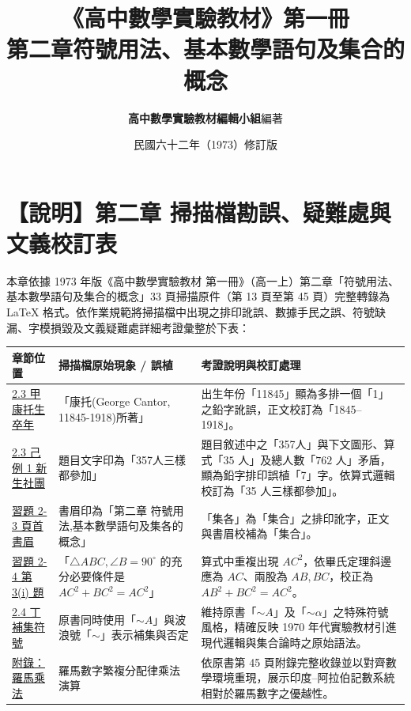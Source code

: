 \documentclass[a4paper,12pt,twoside]{article}
\title{\LARGE\textbf{《高中數學實驗教材》第一冊}\\[0.5em] \Large\textbf{第二章\quad 符號用法、基本數學語句及集合的概念}}
\author{\textbf{高中數學實驗教材編輯小組}\quad 編著}
\date{民國六十二年（1973）修訂版}
\begin{document}
\maketitle
\thispagestyle{firstpage}

\section*{【說明】第二章 掃描檔勘誤、疑難處與文義校訂表}
\label{sec:ch2_errata_notes}\label{sec:master_errata_notes}

本章依據 1973 年版《高中數學實驗教材 第一冊》（高一上）第二章「符號用法、基本數學語句及集合的概念」33 頁掃描原件（第 13 頁至第 45 頁）完整轉錄為 \LaTeX{} 格式。依作業規範將掃描檔中出現之排印訛誤、數據手民之誤、符號缺漏、字模損毀及文義疑難處詳細考證彙整於下表：

\begin{table}[H]
\centering
\small
\renewcommand{\arraystretch}{1.35}
\begin{tabularx}{\textwidth}{|p{3.2cm}|p{3.8cm}|X|}
\hline
\textbf{章節位置} & \textbf{掃描檔原始現象 / 誤植} & \textbf{考證說明與校訂處理} \\ \hline

\hyperref[subsec:2-3-a]{2.3 甲 康托生卒年} & 
「康托(George Cantor, 11845-1918)所著」 & 
出生年份「11845」顯為多排一個「1」之鉛字訛誤，正文校訂為「1845--1918」。 \\ \hline

\hyperref[subsec:2-3-f]{2.3 己 例 1 新生社團} & 
題目文字印為「357人三樣都參加」 & 
題目敘述中之「357人」與下文圖形、算式「$35$ 人」及總人數「$762$ 人」矛盾，顯為鉛字排印誤植「7」字。依算式邏輯校訂為「35 人三樣都參加」。 \\ \hline

\hyperref[sec:ex2-3]{習題 2-3 頁首書眉} & 
書眉印為「第二章 符號用法,基本數學語句及集各的概念」 & 
「集各」為「集合」之排印訛字，正文與書眉校補為「集合」。 \\ \hline

\hyperref[sec:ex2-4]{習題 2-4 第 3(i) 題} & 
「$\triangle ABC, \angle B=90^\circ$ 的充分必要條件是 $AC^2+BC^2=AC^2$」 & 
算式中重複出現 $AC^2$，依畢氏定理斜邊應為 $AC$、兩股為 $AB, BC$，校正為 $AB^2+BC^2=AC^2$。 \\ \hline

\hyperref[subsec:2-4-d]{2.4 丁 補集符號} & 
原書同時使用「$\sim A$」與波浪號「$\sim$」表示補集與否定 & 
維持原書「$\sim A$」及「$\sim \alpha$」之特殊符號風格，精確反映 1970 年代實驗教材引進現代邏輯與集合論時之原始語法。 \\ \hline

\hyperref[sec:ch2-appendix]{附錄：羅馬乘法} & 
羅馬數字繁複分配律乘法演算 & 
依原書第 45 頁附錄完整收錄並以對齊數學環境重現，展示印度--阿拉伯記數系統相對於羅馬數字之優越性。 \\ \hline

\end{tabularx}
\end{table}

\clearpage
\tableofcontents
\newpage


\end{document}
